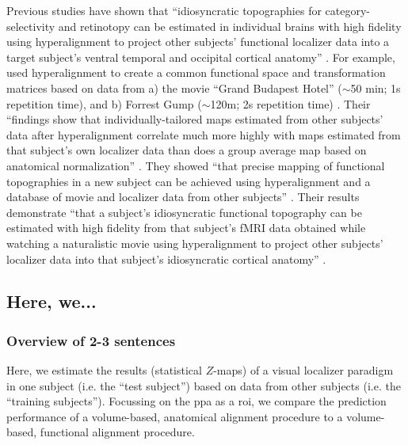 Previous studies \citep{jiahui2020predicting, guntupalli2016model,
haxby2011common} have shown that ``idiosyncratic topographies for
category-selectivity and retinotopy can be estimated in individual brains with
high fidelity using hyperalignment to project other subjects' functional
localizer data into a target subject's ventral temporal and occipital cortical
anatomy'' \citep{jiahui2020predicting}.
%
For example, \citep{jiahui2020predicting} used hyperalignment to create a common
functional space and transformation matrices based on data from a) the movie
``Grand Budapest Hotel'' ($\sim$50 min; 1s repetition time), and b) Forrest Gump
($\sim$120m; 2s repetition time) \citep{hanke2016simultaneous}.
%
Their ``findings show that individually-tailored maps estimated from other
subjects’ data after hyperalignment correlate much more highly with maps
estimated from that subject's own localizer data than does a group average map
based on anatomical normalization'' \citep{jiahui2020predicting}.
%
They showed ``that precise mapping of functional topographies in a new subject
can be achieved using hyperalignment and a database of movie and localizer data
from other subjects'' \citep{jiahui2020predicting}.
%
Their results demonstrate ``that a subject's idiosyncratic functional topography
can be estimated with high fidelity from that subject's fMRI data obtained while
watching a naturalistic movie using hyperalignment to project other subjects'
localizer data into that subject's idiosyncratic cortical anatomy''
\citep{jiahui2020predicting}.


\subsection{Here, we...}


\subsubsection{Overview of 2-3 sentences}

Here, we estimate the results (statistical $Z$-maps) of a visual localizer
paradigm in one subject (i.e. the ``test subject'') based on data from other
subjects (i.e. the ``training subjects'').
%
Focussing on the \ac{ppa} as a \ac{roi}, we compare the prediction performance
of a volume-based, anatomical alignment procedure to a volume-based, functional
alignment procedure.



